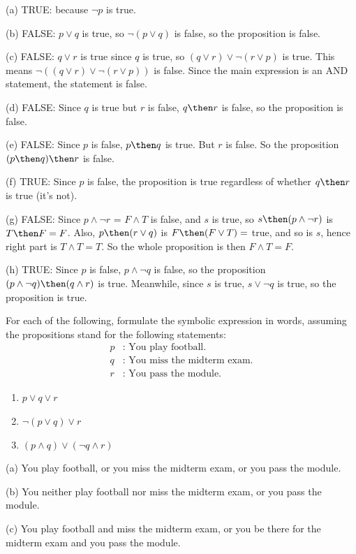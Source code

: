 \documentclass[a4paper,12pt]{article}
\begin{document}
\begin{solution}
	(a) TRUE: because $\neg p$ is true. 
	
	(b) FALSE: $p \vee q$ is true, so $\neg(p \vee q)$ is false, so the proposition is false. 
	
	(c) FALSE: $q \vee r$ is true since $q$ is true, so $(q \vee r) \vee \neg(r \vee p)$ is true. This means $\neg((q \vee r) \vee \neg(r \vee p))$ is false. Since the main expression is an AND statement, the statement is false.
	
	(d) FALSE: Since $q$ is true but $r$ is false, $q \then r$ is false, so the proposition is false. 
	
	(e) FALSE: Since $p$ is false, $p \then q$ is true. But $r$ is false. So the proposition $(p \then q) \then r$ is false. 
	
	(f) TRUE: Since $p$ is false, the proposition is true regardless of whether $q \then r$ is true (it's not). 
	
	(g) FALSE: Since $p \wedge \neg r$ = $F \wedge T$ is false, and  $s$ is true, so $s \then (p \wedge \neg r)$ is $T \then F=F$. Also,  $p \then (r \vee q)$ is $F \then (F \vee T)=$ true, and so is $s$, hence right part is $T\wedge T = T$. So the whole proposition is then $F \wedge T=F$. 
	
	(h) TRUE: Since $p$ is false, $p \wedge \neg q$ is false, so the proposition $(p \wedge \neg q) \then (q \wedge r)$ is true. Meanwhile, since $s$ is true, $s \vee \neg q$ is true, so the proposition is true. 
\end{solution}

\begin{problem}
	For each of the following, formulate the symbolic expression in words, assuming the propositions stand for the following statements: 
	\begin{align*}
	p &: \textrm{ You play football.} \\
	q &: \textrm{ You miss the midterm exam.} \\
	r &: \textrm{ You pass the module.}
	\end{align*}
	\begin{enumerate}[label=(\alph*)]
		\item $p \vee q \vee r$
		\item $\neg(p \vee q) \vee r$
		\item $(p \wedge q) \vee (\neg q \wedge r)$
	\end{enumerate} 
\end{problem}

\begin{solution}
	(a) You play football, or you miss the midterm exam, or you pass the module. 
	
	(b) You neither play football nor miss the midterm exam, or you pass the module. 
	
	(c) You play football and miss the midterm exam, or you be there for the midterm exam and you pass the module. 
\end{solution}
\end{document}
